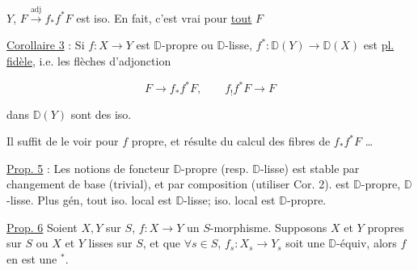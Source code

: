 
$Y$,  $F\xrightarrow{\mathrm{adj}} f_*f^*F$ est iso. En fait, c'est vrai pour \uline{tout} $F$ \unsure{;|:}

\uline{Corollaire 3} : Si $f:X\longrightarrow Y$ est  $\mathbb D$-propre ou $\mathbb D$-lisse,  $f^*:\mathbb D(Y)\longrightarrow\mathbb D(X)$ est \uline{pl. fidèle}, i.e. les flèches d'adjonction

\[
 F\longrightarrow f_*f^*F,\qquad f_!f^*F\longrightarrow F
\]

dans $\mathbb D(Y)$ sont des iso.

Il suffit de le voir pour $f$ propre, et  résulte du calcul des fibres de $f_*f^*F$ \ldots


 \uline{Prop. 5} : Les notions de foncteur $\mathbb D$-propre (resp. $\mathbb D$-lisse) est stable par changement de base (trivial), et par composition (utiliser Cor. 2).    est  $\mathbb D$-propre,   $\mathbb D$-lisse. Plus gén, tout iso. local est $\mathbb D$-lisse;  iso. local est $\mathbb D$-propre.

\uline{Prop. 6} Soient $X,Y$ sur $S$, $f:X\to Y$ un $S$-morphisme. Supposons $X$ et $Y$ propres sur $S$   ou $X$ et $Y$ lisses sur $S$, et que $\forall s\in S$, $f_s:X_s\longrightarrow Y_s$ soit une $\mathbb D$-équiv, alors $f$ en est une $ {}^*$.

